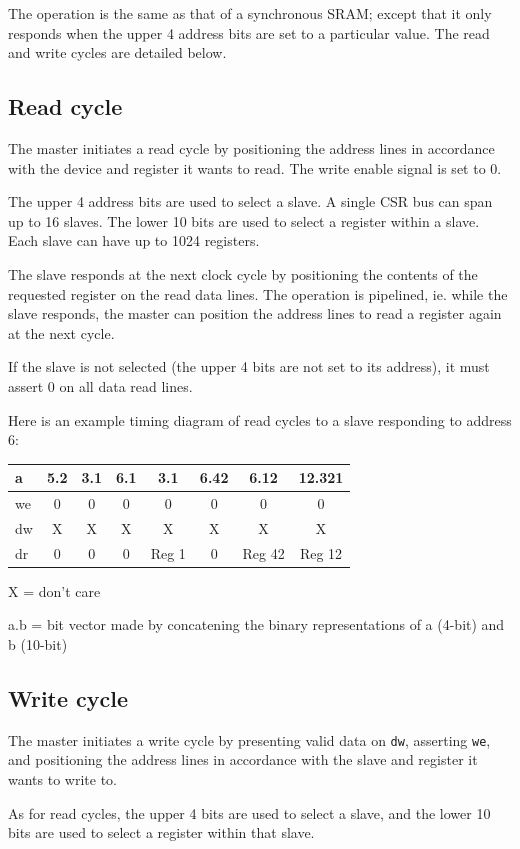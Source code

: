 \documentclass[a4paper,11pt]{article}
\begin{document}
The operation is the same as that of a synchronous SRAM; except that it only responds when the upper 4 address bits are set to a particular value. The read and write cycles are detailed below.

\subsection{Read cycle}
The master initiates a read cycle by positioning the address lines in accordance with the device and register it wants to read. The write enable signal is set to 0.

The upper 4 address bits are used to select a slave. A single CSR bus can span up to 16 slaves. The lower 10 bits are used to select a register within a slave. Each slave can have up to 1024 registers.

The slave responds at the next clock cycle by positioning the contents of the requested register on the read data lines. The operation is pipelined, ie. while the slave responds, the master can position the address lines to read a register again at the next cycle.

If the slave is not selected (the upper 4 bits are not set to its address), it must assert 0 on all data read lines.

Here is an example timing diagram of read cycles to a slave responding to address 6:

\begin{tabular}{|l|c|c|c|c|c|c|c|}
\hline
a & 5.2 & 3.1 & 6.1 & 3.1 & 6.42 & 6.12 & 12.321 \\
\hline
we & 0 & 0 & 0 & 0 & 0 & 0 & 0 \\
\hline
dw & X & X & X & X & X & X & X \\
\hline
dr & 0 & 0 & 0 & Reg 1 & 0 & Reg 42 & Reg 12 \\
\hline
\end{tabular}

X = don't care

a.b = bit vector made by concatening the binary representations of a (4-bit) and b (10-bit)

\subsection{Write cycle}
The master initiates a write cycle by presenting valid data on \verb!dw!, asserting \verb!we!, and positioning the address lines in accordance with the slave and register it wants to write to.

As for read cycles, the upper 4 bits are used to select a slave, and the lower 10 bits are used to select a register within that slave.
\end{document}

